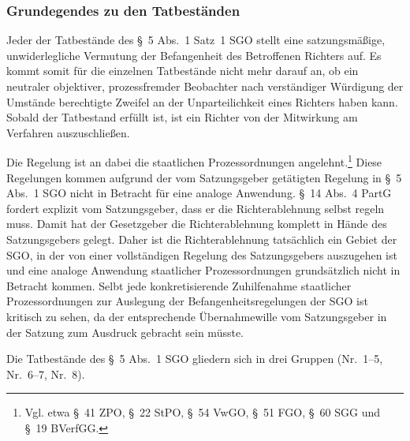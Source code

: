 \subsubsection{Grundegendes zu den Tatbeständen}
\label{Zusammensetzung:Spruchkoerper:Befangenheitsvermutung:Tatbestandsgrundsaetze}
Jeder der Tatbestände des \S~5 Abs.~1 Satz~1 SGO stellt eine satzungsmäßige, unwiderlegliche Vermutung der Befangenheit des Betroffenen Richters auf.
Es kommt somit für die einzelnen Tatbestände nicht mehr darauf an, ob ein neutraler objektiver, prozessfremder Beobachter nach verständiger Würdigung der Umstände berechtigte Zweifel an der Unparteilichkeit eines Richters haben kann.
Sobald der Tatbestand erfüllt ist, ist ein Richter von der Mitwirkung am Verfahren auszuschließen.

Die Regelung ist an dabei die staatlichen Prozessordnungen angelehnt.\footnote{Vgl. etwa \S~41 ZPO,  \S~22 StPO, \S~54 VwGO, \S~51 FGO, \S~60 SGG und \S~19 BVerfGG.}
Diese Regelungen kommen aufgrund der vom Satzungsgeber getätigten Regelung in \S~5 Abs.~1 SGO nicht in Betracht für eine analoge Anwendung.
\S~14 Abs.~4 PartG fordert explizit vom Satzungsgeber, dass er die Richterablehnung selbst regeln muss.
Damit hat der Gesetzgeber die Richterablehnung komplett in Hände des Satzungsgebers gelegt.
Daher ist die Richterablehnung tatsächlich ein Gebiet der SGO, in der von einer vollständigen Regelung des Satzungsgebers auszugehen ist und eine analoge Anwendung staatlicher Prozessordnungen grundsätzlich nicht in Betracht kommen.
Selbt jede konkretisierende Zuhilfenahme staatlicher Prozessordnungen zur Auslegung der Befangenheitsregelungen der SGO ist kritisch zu sehen, da der entsprechende Übernahmewille vom Satzungsgeber in der Satzung zum Ausdruck gebracht sein müsste.

Die Tatbestände des \S~5 Abs.~1 SGO gliedern sich in drei Gruppen (Nr.~1--5, Nr.~6--7, Nr.~8).

